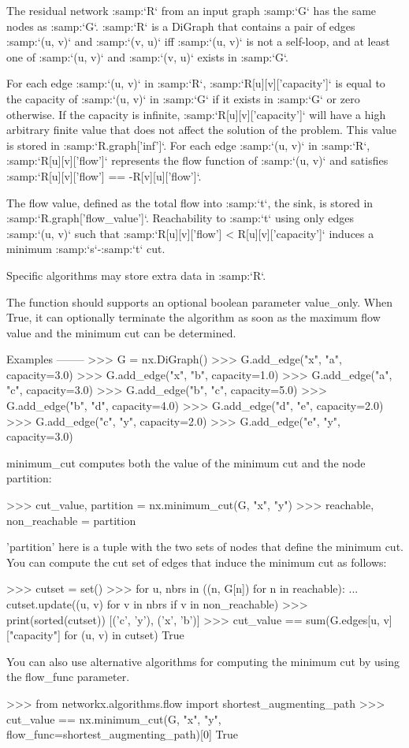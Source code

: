 \begin{DoxyVerb}
The residual network :samp:`R` from an input graph :samp:`G` has the
same nodes as :samp:`G`. :samp:`R` is a DiGraph that contains a pair
of edges :samp:`(u, v)` and :samp:`(v, u)` iff :samp:`(u, v)` is not a
self-loop, and at least one of :samp:`(u, v)` and :samp:`(v, u)` exists
in :samp:`G`.

For each edge :samp:`(u, v)` in :samp:`R`, :samp:`R[u][v]['capacity']`
is equal to the capacity of :samp:`(u, v)` in :samp:`G` if it exists
in :samp:`G` or zero otherwise. If the capacity is infinite,
:samp:`R[u][v]['capacity']` will have a high arbitrary finite value
that does not affect the solution of the problem. This value is stored in
:samp:`R.graph['inf']`. For each edge :samp:`(u, v)` in :samp:`R`,
:samp:`R[u][v]['flow']` represents the flow function of :samp:`(u, v)` and
satisfies :samp:`R[u][v]['flow'] == -R[v][u]['flow']`.

The flow value, defined as the total flow into :samp:`t`, the sink, is
stored in :samp:`R.graph['flow_value']`. Reachability to :samp:`t` using
only edges :samp:`(u, v)` such that
:samp:`R[u][v]['flow'] < R[u][v]['capacity']` induces a minimum
:samp:`s`-:samp:`t` cut.

Specific algorithms may store extra data in :samp:`R`.

The function should supports an optional boolean parameter value_only. When
True, it can optionally terminate the algorithm as soon as the maximum flow
value and the minimum cut can be determined.

Examples
--------
>>> G = nx.DiGraph()
>>> G.add_edge("x", "a", capacity=3.0)
>>> G.add_edge("x", "b", capacity=1.0)
>>> G.add_edge("a", "c", capacity=3.0)
>>> G.add_edge("b", "c", capacity=5.0)
>>> G.add_edge("b", "d", capacity=4.0)
>>> G.add_edge("d", "e", capacity=2.0)
>>> G.add_edge("c", "y", capacity=2.0)
>>> G.add_edge("e", "y", capacity=3.0)

minimum_cut computes both the value of the
minimum cut and the node partition:

>>> cut_value, partition = nx.minimum_cut(G, "x", "y")
>>> reachable, non_reachable = partition

'partition' here is a tuple with the two sets of nodes that define
the minimum cut. You can compute the cut set of edges that induce
the minimum cut as follows:

>>> cutset = set()
>>> for u, nbrs in ((n, G[n]) for n in reachable):
...     cutset.update((u, v) for v in nbrs if v in non_reachable)
>>> print(sorted(cutset))
[('c', 'y'), ('x', 'b')]
>>> cut_value == sum(G.edges[u, v]["capacity"] for (u, v) in cutset)
True

You can also use alternative algorithms for computing the
minimum cut by using the flow_func parameter.

>>> from networkx.algorithms.flow import shortest_augmenting_path
>>> cut_value == nx.minimum_cut(G, "x", "y", flow_func=shortest_augmenting_path)[0]
True\end{DoxyVerb}
